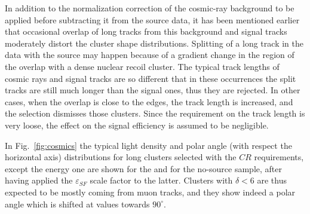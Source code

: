 In addition to the normalization correction of the cosmic-ray
background to be applied before subtracting it from the source data,
it has been mentioned earlier that occasional overlap of long tracks
from this background and signal tracks moderately distort the cluster
shape distributions. Splitting of a long track in the data with the
source may happen because of a gradient change in the region of the
overlap with a dense nuclear recoil cluster. The typical track lengths
of cosmic rays and signal tracks are so different that in these
occurrences the split tracks are still much longer than the signal
ones, thus they are rejected.  In other cases, when the overlap is
close to the edges, the track length is increased, and the selection
dismisses those clusters.  Since the requirement on the track length
is very loose, the effect on the signal efficiency is assumed to be
negligible.

In Fig.~\ref{fig:cosmics} the typical light density and polar angle
(with respect the horizontal axis) distributions for long clusters
selected with the $CR$ requirements, except the energy one are shown
for the \ambe and for the no-source sample, after having applied the
$\varepsilon_{SF}$ scale factor to the latter.  Clusters with
$\delta<6$ are thus expected to be mostly coming from muon tracks, and
they show indeed a polar angle which is shifted at values towards
$90^\circ$.



